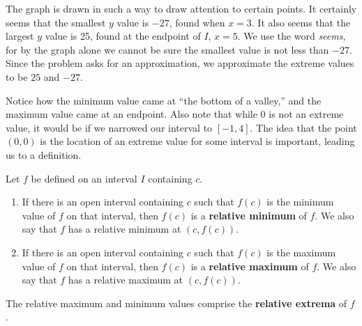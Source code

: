 {The graph is drawn in such a way to draw attention to certain points. It certainly seems that the smallest $y$ value is $-27$, found when $x=3$. It also seems that the largest $y$ value is 25, found at the endpoint of $I$, $x=5$. We use the word \textit{seems}, for by the graph alone we cannot be sure the smallest value is not less than $-27$. Since the problem asks for an approximation, we approximate the extreme values to be $25$ and $-27$.}

Notice how the minimum value came at ``the bottom of a valley,'' and the maximum value came at an endpoint. Also note that while $0$ is not an extreme value, it would be if we narrowed our interval to $[-1,4]$. The idea that the point $(0,0)$ is the location of an extreme value for some interval is important, leading us to a definition.

%
{Let $f$ be defined on an interval $I$ containing $c$. 
\begin{enumerate}
	\item	If there is an open interval containing $c$ such that $f(c)$ is the minimum value of $f$ on that interval, then $f(c)$ is a \textbf{relative minimum} of $f$. We also say that $f$ has a relative minimum at $(c,f(c))$.
	\item	If there is an open interval containing $c$ such that $f(c)$ is the maximum value of $f$ on that interval, then $f(c)$ is a \textbf{relative maximum} of $f$. We also say that $f$ has a relative maximum at $(c,f(c))$.
\end{enumerate}

The relative maximum and minimum values comprise the \textbf{relative extrema} of $f$.}

